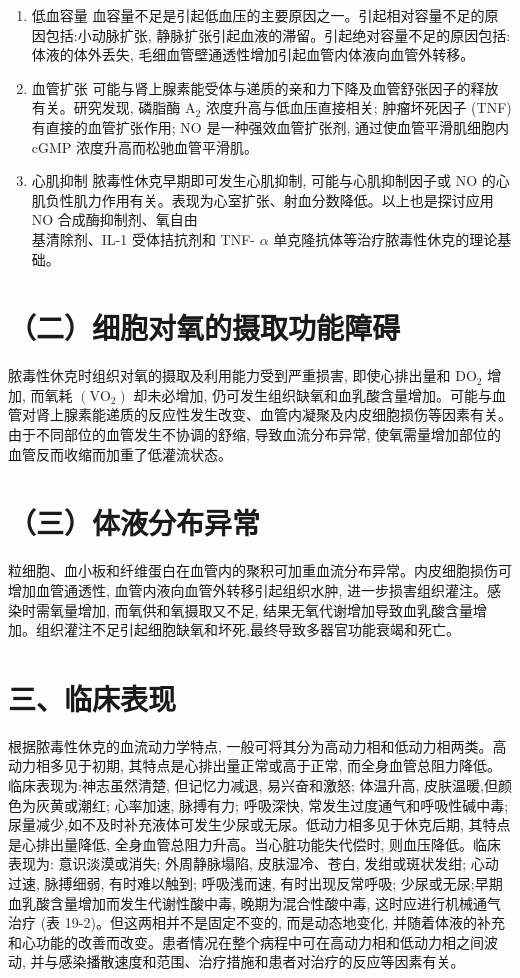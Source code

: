 \documentclass[10pt]{article}
\begin{document}
\begin{enumerate}
  \item 低血容量 血容量不足是引起低血压的主要原因之一。引起相对容量不足的原因包括:小动脉扩张, 静脉扩张引起血液的滞留。引起绝对容量不足的原因包括: 体液的体外丢失, 毛细血管壁通透性增加引起血管内体液向血管外转移。

  \item 血管扩张 可能与肾上腺素能受体与递质的亲和力下降及血管舒张因子的释放有关。研究发现, 磷脂酶 $\mathrm{A}_{2}$ 浓度升高与低血压直接相关; 肿瘤坏死因子 (TNF) 有直接的血管扩张作用; NO 是一种强效血管扩张剂, 通过使血管平滑肌细胞内 cGMP 浓度升高而松驰血管平滑肌。

  \item 心肌抑制 脓毒性休克早期即可发生心肌抑制, 可能与心肌抑制因子或 NO 的心肌负性肌力作用有关。表现为心室扩张、射血分数降低。以上也是探讨应用 NO 合成酶抑制剂、氧自由\\
基清除剂、IL-1 受体拮抗剂和 TNF- $\alpha$ 单克隆抗体等治疗脓毒性休克的理论基础。

\end{enumerate}

\section*{（二）细胞对氧的摄取功能障碍}
脓毒性休克时组织对氧的摄取及利用能力受到严重损害, 即使心排出量和 $\mathrm{DO}_{2}$ 增加, 而氧耗 $\left(\mathrm{VO}_{2}\right)$ 却未必增加, 仍可发生组织缺氧和血乳酸含量增加。可能与血管对肾上腺素能递质的反应性发生改变、血管内凝聚及内皮细胞损伤等因素有关。由于不同部位的血管发生不协调的舒缩, 导致血流分布异常, 使氧需量增加部位的血管反而收缩而加重了低灌流状态。

\section*{（三）体液分布异常}
粒细胞、血小板和纤维蛋白在血管内的聚积可加重血流分布异常。内皮细胞损伤可增加血管通透性, 血管内液向血管外转移引起组织水肿, 进一步损害组织灌注。感染时需氧量增加, 而氧供和氧摄取又不足, 结果无氧代谢增加导致血乳酸含量增加。组织灌注不足引起细胞缺氧和坏死,最终导致多器官功能衰竭和死亡。

\section*{三、临床表现}
根据脓毒性休克的血流动力学特点, 一般可将其分为高动力相和低动力相两类。高动力相多见于初期, 其特点是心排出量正常或高于正常, 而全身血管总阻力降低。临床表现为:神志虽然清楚, 但记忆力减退, 易兴奋和激怒; 体温升高, 皮肤温暖,但颜色为灰黄或潮红; 心率加速, 脉搏有力; 呼吸深快, 常发生过度通气和呼吸性碱中毒; 尿量减少,如不及时补充液体可发生少尿或无尿。低动力相多见于休克后期, 其特点是心排出量降低, 全身血管总阻力升高。当心脏功能失代偿时, 则血压降低。临床表现为: 意识淡漠或消失; 外周静脉塌陷, 皮肤湿冷、苍白, 发绀或斑状发绀; 心动过速, 脉搏细弱, 有时难以触到; 呼吸浅而速, 有时出现反常呼吸; 少尿或无尿;早期血乳酸含量增加而发生代谢性酸中毒, 晚期为混合性酸中毒, 这时应进行机械通气治疗 (表 19-2)。但这两相并不是固定不变的, 而是动态地变化, 并随着体液的补充和心功能的改善而改变。患者情况在整个病程中可在高动力相和低动力相之间波动, 并与感染播散速度和范围、治疗措施和患者对治疗的反应等因素有关。
\end{document}
